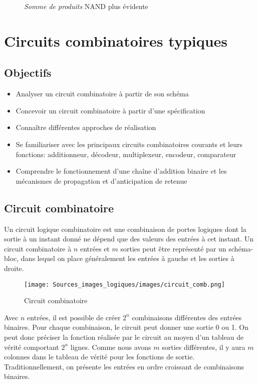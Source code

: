 \documentclass[11pt]{article}
\begin{document}
\begin{figure}[htbp]
\centering

\caption{\label{fig:orgd90fe9f}\emph{Somme de produits} NAND plus évidente}
\end{figure}

\section{Circuits combinatoires typiques}
\label{sec:orga2114ea}
\subsection{Objectifs}
\label{sec:orgfd141f5}
\begin{itemize}
\item Analyser un circuit combinatoire à partir de son schéma
\item Concevoir un circuit combinatoire à partir d'une spécification
\item Connaître différentes approches de réalisation
\item Se familiariser avec les principaux circuits combinatoires courants et
leurs fonctions: additionneur, décodeur, multiplexeur, encodeur,
comparateur
\item Comprendre le fonctionnement d'une chaîne d'addition binaire et les
mécanismes de propagation et d'anticipation de retenue
\end{itemize}

\subsection{Circuit combinatoire}
\label{sec:orgcd82b82}

Un circuit logique combinatoire est une combinaison de portes logiques
dont la sortie à un instant donné ne dépend que des valeurs des
entrées à cet instant. Un circuit combinatoire à \(n\) entrées et
\(m\) sorties peut être représenté par un schéma-bloc, dans lequel on
place généralement les entrées à gauche et les sorties à droite.

\begin{figure}[htbp]
\centering
\texttt{[image: Sources\_images\_logiques/images/circuit\_comb.png]}
\caption{\label{fig:org651e246}Circuit combinatoire}
\end{figure}

Avec \(n\) entrées, il est possible de créer \(2^n\) combinaisons
différentes des entrées binaires. Pour chaque combinaison, le circuit
peut donner une sortie 0 ou 1. On peut donc préciser la fonction
réalisée par le circuit au moyen d'un tableau de vérité comportant \(2^n\)
lignes. Comme nous avons \(m\) sorties différentes, il y aura \(m\)
colonnes dans le tableau de vérité pour les fonctions de
sortie. Traditionnellement, on présente les entrées en ordre croissant
de combinaisons binaires.
\end{document}
